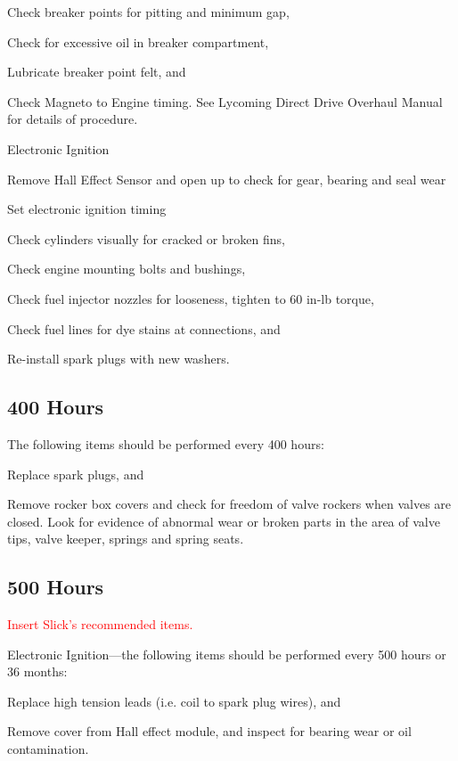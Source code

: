 \begin{enumerate*}
	\begin{enumerate*}
		\item Check breaker points for pitting and minimum gap, 
		\item Check for excessive oil in breaker compartment, 
		\item Lubricate breaker point felt, and 
		\item Check Magneto to Engine timing. See Lycoming Direct Drive Overhaul Manual for details of procedure.
	\end{enumerate*} 
	\item Electronic Ignition
	  \begin{enumerate*}
	    \item Remove Hall Effect Sensor and open up to check for gear, bearing and seal wear
	    \item Set electronic ignition timing
    	\end{enumerate*} 	
	\item Check cylinders visually for cracked or broken fins, 
	\item Check engine mounting bolts and bushings, 
	\item Check fuel injector nozzles for looseness, tighten to 60 in-lb torque, 
	\item Check fuel lines for dye stains at connections, and 
	\item Re-install spark plugs with new washers. 
\end{enumerate*}

\subsection{400 Hours} The following items should be performed every 400 hours: 
\begin{enumerate*}
	\item Replace spark plugs, and 
	\item Remove rocker box covers and check for freedom of valve rockers when valves are closed. Look for evidence of abnormal wear or broken parts in the area of valve tips, valve keeper, springs and spring seats. 
\end{enumerate*}

\subsection{500 Hours} 
\begin{enumerate*}
	\item\textcolor{red}{Insert Slick's recommended items.} 
	\item Electronic Ignition---the following items should be performed every 500 hours or 36 months: 
	\begin{enumerate*}
		\item Replace high tension leads (i.e. coil to spark plug wires), and 
		\item Remove cover from Hall effect module, and inspect for bearing wear or oil contamination. 
	\end{enumerate*}
\end{enumerate*}

